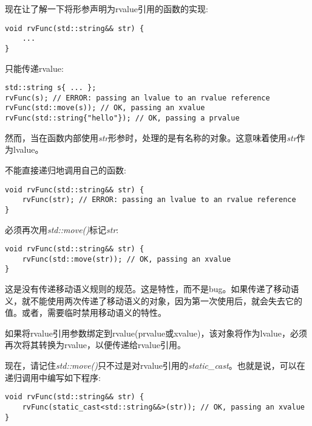 现在让了解一下将形参声明为rvalue引用的函数的实现:\par

\begin{lstlisting}[caption={}]
void rvFunc(std::string&& str) {
	...
}
\end{lstlisting}

只能传递rvalue:\par

\begin{lstlisting}[caption={}]
std::string s{ ... };
rvFunc(s); // ERROR: passing an lvalue to an rvalue reference
rvFunc(std::move(s)); // OK, passing an xvalue
rvFunc(std::string{"hello"}); // OK, passing a prvalue
\end{lstlisting}

然而，当在函数内部使用\textit{str}形参时，处理的是有名称的对象。这意味着使用\textit{str}作为lvalue。\par

不能直接递归地调用自己的函数:\par

\begin{lstlisting}[caption={}]
void rvFunc(std::string&& str) {
	rvFunc(str); // ERROR: passing an lvalue to an rvalue reference
}
\end{lstlisting}

必须再次用\textit{std::move()}标记\textit{str}:\par

\begin{lstlisting}[caption={}]
void rvFunc(std::string&& str) {
	rvFunc(std::move(str)); // OK, passing an xvalue
}
\end{lstlisting}

这是没有传递移动语义规则的规范。这是特性，而不是bug。如果传递了移动语义，就不能使用两次传递了移动语义的对象，因为第一次使用后，就会失去它的值。或者，需要临时禁用移动语义的特性。\par

如果将rvalue引用参数绑定到rvalue(prvalue或xvalue)，该对象将作为lvalue，必须再次将其转换为rvalue，以便传递给rvalue引用。\par

现在，请记住\textit{std::move()}只不过是对rvalue引用的\textit{static\_cast}。也就是说，可以在递归调用中编写如下程序:\par

\begin{lstlisting}[caption={}]
void rvFunc(std::string&& str) {
	rvFunc(static_cast<std::string&&>(str)); // OK, passing an xvalue
}
\end{lstlisting}

